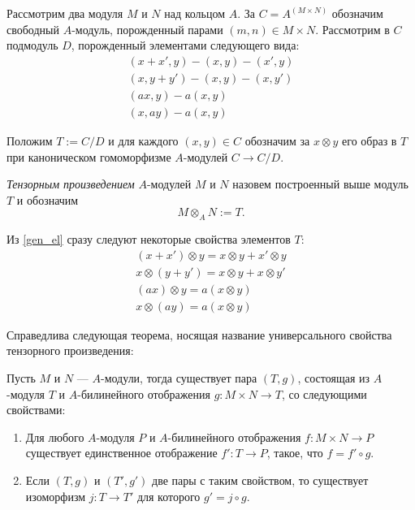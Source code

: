     Рассмотрим два модуля $M$ и $N$ над кольцом $A$. За $C = A^{(M \times N)}$ обозначим свободный $A$-модуль, 
    порожденный парами $(m, n) \in M \times N$. Рассмотрим в $C$ подмодуль $D$, порожденный элементами следующего вида:
    \begin{equation}\label{gen_el}
        \begin{split}
            (x + x', y) - (x, y) - (x', y) \\
            (x, y + y') - (x, y) - (x, y') \\ 
            (ax, y) - a(x, y) \\
            (x, ay) - a(x, y) 
        \end{split}
    \end{equation}

    Положим $T := C/D$ и для каждого $(x, y) \in C$ обозначим за $x \otimes y$ его образ в $T$ при каноническом гомоморфизме $A$-модулей $C \rightarrow C/D$.
    
    \begin{Def}
        \textit{Тензорным произведением} $A$-модулей $M$ и $N$ назовем построенный выше модуль $T$ и обозначим $$M \otimes_A N := T.$$
    \end{Def}
    
    Из \eqref{gen_el} сразу следуют некоторые свойства элементов $T$:
    \begin{equation*}\label{tensor_prop}
        \begin{split}
            (x + x') \otimes y = x \otimes y + x' \otimes y\\
            x \otimes (y + y') = x \otimes y + x \otimes y' \\ 
            (ax) \otimes y = a(x \otimes y) \\
            x \otimes (ay) = a(x \otimes y)
        \end{split}
    \end{equation*}

    Справедлива следующая теорема, носящая название универсального свойства тензорного произведения:
    \begin{Theorem}{\cite{A-M}} Пусть $M$ и $N$ --- $A$-модули, тогда существует пара $(T, g)$, состоящая из $A$-модуля $T$ и $A$-билинейного 
        отображения  $g: M \times N \rightarrow T$, со следующими свойствами:
        \begin{enumerate}
            \item Для любого $A$-модуля $P$ и $A$-билинейного отображения $f : M\times N \rightarrow P$ существует
                единственное отображение $f' : T \rightarrow P$, такое, что $f = f' \circ g$.
            \item Если $(T, g)$ и $(T', g')$ две пары с таким свойством, то существует изоморфизм $j : T \rightarrow T'$ для
                которого $g' = j \circ g$.
        \end{enumerate}
    \end{Theorem}

